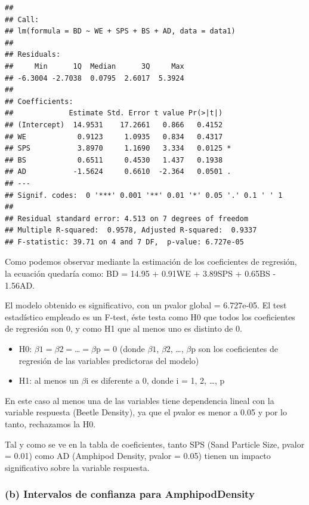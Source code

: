 \documentclass[
]{article}
\providecommand{\tightlist}{%
  \setlength{\itemsep}{0pt}\setlength{\parskip}{0pt}}
\begin{document}
\begin{verbatim}
## 
## Call:
## lm(formula = BD ~ WE + SPS + BS + AD, data = data1)
## 
## Residuals:
##     Min      1Q  Median      3Q     Max 
## -6.3004 -2.7038  0.0795  2.6017  5.3924 
## 
## Coefficients:
##             Estimate Std. Error t value Pr(>|t|)  
## (Intercept)  14.9531    17.2661   0.866   0.4152  
## WE            0.9123     1.0935   0.834   0.4317  
## SPS           3.8970     1.1690   3.334   0.0125 *
## BS            0.6511     0.4530   1.437   0.1938  
## AD           -1.5624     0.6610  -2.364   0.0501 .
## ---
## Signif. codes:  0 '***' 0.001 '**' 0.01 '*' 0.05 '.' 0.1 ' ' 1
## 
## Residual standard error: 4.513 on 7 degrees of freedom
## Multiple R-squared:  0.9578, Adjusted R-squared:  0.9337 
## F-statistic: 39.71 on 4 and 7 DF,  p-value: 6.727e-05
\end{verbatim}

Como podemos observar mediante la estimación de los coeficientes de
regresión, la ecuación quedaría como: BD = 14.95 + 0.91WE + 3.89SPS +
0.65BS - 1.56AD.

El modelo obtenido es significativo, con un pvalor global = 6.727e-05.
El test estadístico empleado es un F-test, éste testa como H0 que todos
los coeficientes de regresión son 0, y como H1 que al menos uno es
distinto de 0.

\begin{itemize}
\tightlist
\item
  H0: \(\beta1 = \beta2 =\)\ldots{}\(=\beta\)p = 0 (donde \(\beta1\),
  \(\beta2\), \ldots, \(\beta\)p son los coeficientes de regresión de
  las variables predictoras del modelo)
\item
  H1: al menos un \(\beta\)i es diferente a 0, donde i = 1, 2, \ldots, p
\end{itemize}

En este caso al menos una de las variables tiene dependencia lineal con
la variable respuesta (Beetle Density), ya que el pvalor es menor a 0.05
y por lo tanto, rechazamos la H0.

Tal y como se ve en la tabla de coeficientes, tanto SPS (Sand Particle
Size, pvalor = 0.01) como AD (Amphipod Density, pvalor = 0.05) tienen un
impacto significativo sobre la variable respuesta.

\hypertarget{b-intervalos-de-confianza-para-amphipoddensity}{%
\subsubsection{(b) Intervalos de confianza para
AmphipodDensity}\label{b-intervalos-de-confianza-para-amphipoddensity}}
\end{document}
